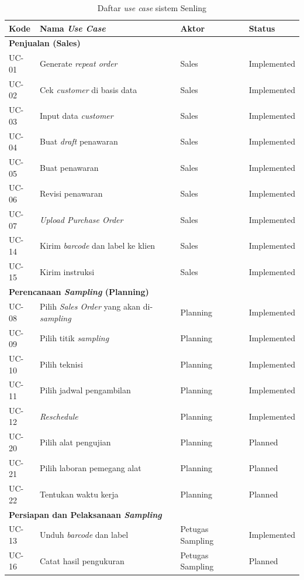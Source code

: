 \begin{table}[h]
\centering
\caption{Daftar \textit{use case} sistem Senling}
\label{tab:use-case}
\begin{tabular}{|l|p{6.5cm}|p{3cm}|l|}
\hline
\textbf{Kode} & \textbf{Nama \textit{Use Case}} & \textbf{Aktor} & \textbf{Status} \\
\hline
\multicolumn{4}{|l|}{\textbf{Penjualan (Sales)}} \\
\hline
UC-01 & Generate \textit{repeat order} & Sales & Implemented \\
UC-02 & Cek \textit{customer} di basis data & Sales & Implemented \\
UC-03 & Input data \textit{customer} & Sales & Implemented \\
UC-04 & Buat \textit{draft} penawaran & Sales & Implemented \\
UC-05 & Buat penawaran & Sales & Implemented \\
UC-06 & Revisi penawaran & Sales & Implemented \\
UC-07 & \textit{Upload Purchase Order} & Sales & Implemented \\
UC-14 & Kirim \textit{barcode} dan label ke klien & Sales & Implemented \\
UC-15 & Kirim instruksi & Sales & Implemented \\
\hline
\multicolumn{4}{|l|}{\textbf{Perencanaan \textit{Sampling} (Planning)}} \\
\hline
UC-08 & Pilih \textit{Sales Order} yang akan di-\textit{sampling} & Planning & Implemented \\
UC-09 & Pilih titik \textit{sampling} & Planning & Implemented \\
UC-10 & Pilih teknisi & Planning & Implemented \\
UC-11 & Pilih jadwal pengambilan & Planning & Implemented \\
UC-12 & \textit{Reschedule} & Planning & Implemented \\
UC-20 & Pilih alat pengujian & Planning & Planned \\
UC-21 & Pilih laboran pemegang alat & Planning & Planned \\
UC-22 & Tentukan waktu kerja & Planning & Planned \\
\hline
\multicolumn{4}{|l|}{\textbf{Persiapan dan Pelaksanaan \textit{Sampling}}} \\
\hline
UC-13 & Unduh \textit{barcode} dan label & Petugas Sampling & Implemented \\
UC-16 & Catat hasil pengukuran & Petugas Sampling & Planned \\

\end{tabular}
\end{table}
